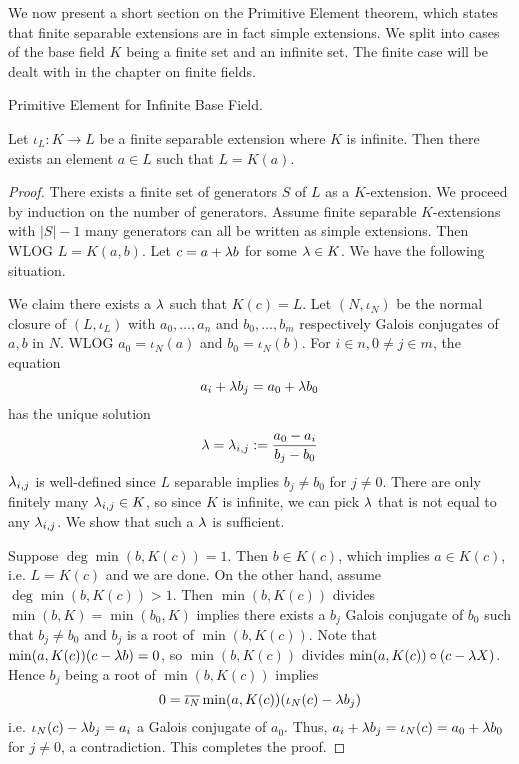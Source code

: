 \documentclass[../book.tex]{subfiles}
\begin{document}
We now present a short section on the Primitive Element theorem,
which states that finite separable extensions are in fact simple extensions.
We split into cases of the base field $K$ being a finite set and an infinite set. 
The finite case will be dealt with in the chapter on finite fields. 

\begin{thm} Primitive Element for Infinite Base Field.
    
    Let $\iota_L : K \to L$ be a finite separable extension where $K$ is infinite. 
    Then there exists an element $a \in L$ such that $L = K(a)$. 
\end{thm}
\begin{proof}
    
    There exists a finite set of generators $S$ of $L$ as a $K$-extension.
    We proceed by induction on the number of generators. 
    Assume finite separable $K$-extensions with $|S|-1$ many generators 
    can all be written as simple extensions. 
    Then WLOG $L = K(a, b)$. 
    Let $c = a + \lambda b$ for some $\lambda \in K$. 
    We have the following situation. 
    \begin{figure}[H]
        \centering
    \end{figure}
    We claim there exists a $\lambda$ such that $K(c) = L$. 
    Let $(N,\iota_N)$ be the normal closure of $(L,\iota_L)$
    with $a_0,\dots,a_n$ and $b_0,\dots,b_m$ 
    respectively Galois conjugates of $a, b$ in $N$.
    WLOG $a_0 = \iota_N(a)$ and $b_0 = \iota_N(b)$.
    For $i \in n, 0 \neq j \in m$, the equation \[
        a_i + \lambda b_j = a_0 + \lambda b_0
    \]
    has the unique solution \[
        \lambda = \lambda_{i,j} := \frac{a_0 - a_i}{b_j - b_0}
    \]
    $\lambda_{i,j}$ is well-defined since $L$ separable 
    implies $b_j \neq b_0$ for $j\neq0$.
    There are only finitely many $\lambda_{i,j} \in K$, so since $K$ is infinite, 
    we can pick $\lambda$ that is not equal to any $\lambda_{i,j}$. 
    We show that such a $\lambda$ is sufficient.
    
    Suppose $\deg\min(b,K(c)) = 1$. 
    Then $b \in K(c)$, which implies $a \in K(c)$, i.e. $L = K(c)$ and we are done. 
    On the other hand, assume $\deg\min(b,K(c)) > 1$. 
    Then $\min(b,K(c))$ divides $\min(b,K) = \min(b_0,K)$ implies
    there exists a $b_j$ Galois conjugate of $b_0$ such that 
    $b_j \neq b_0$ and $b_j$ is a root of $\min(b,K(c))$. 
    Note that $\min(a,K(c)) (c - \lambda b) = 0$,
    so $\min(b,K(c))$ divides $\min(a,K(c)) \circ (c - \lambda X)$.
    Hence $b_j$ being a root of $\min(b,K(c))$ implies
    \[ 0 = \overline{\iota_N} \min(a,K(c)) (\iota_N(c) - \lambda b_j) \]
    i.e. $\iota_N(c) - \lambda b_j = a_i$ a Galois conjugate of $a_0$.
    Thus, $a_i + \lambda b_j = \iota_N(c) = a_0 + \lambda b_0$ for $j \neq 0$, 
    a contradiction. 
    This completes the proof. 
    
\end{proof}
\end{document}
